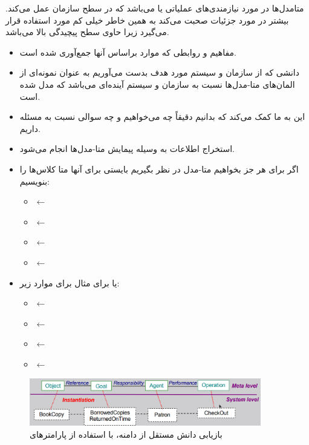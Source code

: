 متامدل‌ها در مورد نیازمندی‌های عملیاتی یا  می‌باشد که در سطح
سازمان عمل می‌کند. بیشتر در مورد جزئیات صحبت می‌کند به همین خاطر خیلی کم مورد
استفاده قرار می‌گیرد زیرا حاوی سطح پیچیدگی بالا می‌باشد.

\begin{itemize}
    \item مفاهیم و روابطی که موارد  براساس آنها جمع‌آوری شده است.
    \item دانشی که از سازمان و سیستم مورد هدف بدست می‌آوریم به عنوان نمونه‌ای از
    المان‌های متا-مدل‌ها نسبت به سازمان و سیستم آینده‌ای می‌باشد که مدل شده است.
    \item این به ما کمک می‌کند که بدانیم دقیقاً چه می‌خواهیم و چه سوالی نسبت به
    مسئله داریم.
    \item استخراج اطلاعات به وسیله پیمایش متا-مدل‌ها انجام می‌شود. 
    \item اگر برای هر جز بخواهیم متا-مدل در نظر بگیریم بایستی برای آنها متا
    کلاس‌ها را بنویسیم: \begin{itemize}
        \item {} $\leftarrow$ 
        \item {} $\leftarrow$ 
        \item {} $\leftarrow$ 
        \item {} $\leftarrow$ 
    \end{itemize}
    \item یا برای مثال برای موارد زیر: \begin{itemize}
        \item {} $\leftarrow$ 
        \item {} $\leftarrow$ 
        \item {} $\leftarrow$ 
        \item {} $\leftarrow$ 
    \end{itemize}
\end{itemize}

\begin{figure}[H]
    \centering
    \includegraphics[width=0.9\textwidth]{images/meta-model_rd.png}
    \caption{بازیابی دانش مستقل از دامنه، با استفاده از پارامتر‌های }
\end{figure}

